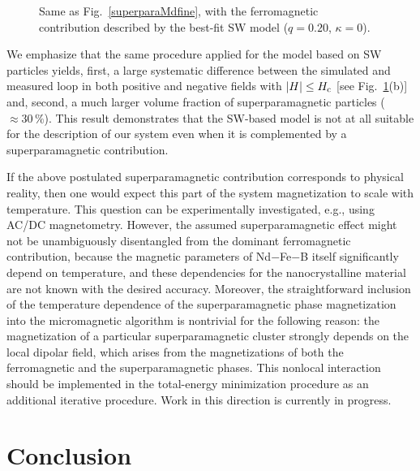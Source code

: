 \documentclass[prm,twocolumn,showkeys,preprintnumbers,amsmath,amssymb,superscriptaddress,aps,10pt]{revtex4-1}
\begin{document}
\begin{figure}[htb]
\centering
{}
\caption{Same as Fig.~\ref{superparaMdfine}, with the ferromagnetic contribution described by the best-fit SW model ($q = 0.20$, $\kappa = 0$).}
\label{superparaMswfine}
\end{figure}

We emphasize that the same procedure applied for the model based on SW particles yields, first, a large systematic difference between the simulated and measured loop in both positive and negative fields with $\vert H \vert \leq H_{\rm c}$ [see Fig.~\ref{superparaMswfine}(b)] and, second, a much larger volume fraction of superparamagnetic particles ($\approx 30 \, \%$). This result demonstrates that the SW-based model is not at all suitable for the description of our system even when it is complemented by a superparamagnetic contribution.

If the above postulated superparamagnetic contribution corresponds to physical reality, then one would expect this part of the system magnetization to scale with temperature. This question can be experimentally investigated, e.g., using AC/DC magnetometry. However, the assumed superparamagnetic effect might not be unambiguously disentangled from the dominant ferromagnetic contribution, because the magnetic parameters of Nd$-$Fe$-$B itself significantly depend on temperature, and these dependencies for the nanocrystalline material are not known with the desired accuracy. Moreover, the straightforward inclusion of the temperature dependence of the superparamagnetic phase magnetization into the micromagnetic algorithm is nontrivial for the following reason: the magnetization of a particular superparamagnetic cluster strongly depends on the local dipolar field, which arises from the magnetizations of both the ferromagnetic and the superparamagnetic phases. This nonlocal interaction should be implemented in the total-energy minimization procedure as an additional iterative procedure. Work in this direction is currently in progress.

\section{Conclusion}
\end{document}
